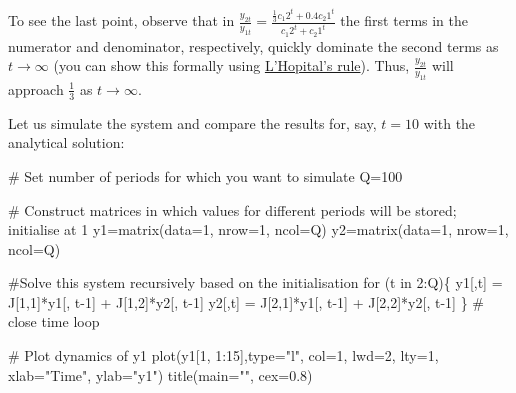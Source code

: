 \documentclass[
  letterpaper,
  DIV=11,
  numbers=noendperiod]{scrreprt}
\newenvironment{Shaded}{\begin{snugshade}}{\end{snugshade}}
\newcommand{\AttributeTok}[1]{\textcolor[rgb]{0.40,0.45,0.13}{#1}}
\newcommand{\CommentTok}[1]{\textcolor[rgb]{0.37,0.37,0.37}{#1}}
\newcommand{\ControlFlowTok}[1]{\textcolor[rgb]{0.00,0.23,0.31}{#1}}
\newcommand{\DecValTok}[1]{\textcolor[rgb]{0.68,0.00,0.00}{#1}}
\newcommand{\FloatTok}[1]{\textcolor[rgb]{0.68,0.00,0.00}{#1}}
\newcommand{\FunctionTok}[1]{\textcolor[rgb]{0.28,0.35,0.67}{#1}}
\newcommand{\NormalTok}[1]{\textcolor[rgb]{0.00,0.23,0.31}{#1}}
\newcommand{\OtherTok}[1]{\textcolor[rgb]{0.00,0.23,0.31}{#1}}
\newcommand{\SpecialCharTok}[1]{\textcolor[rgb]{0.37,0.37,0.37}{#1}}
\newcommand{\StringTok}[1]{\textcolor[rgb]{0.13,0.47,0.30}{#1}}
\begin{document}
To see the last point, observe that in
\(\frac{y_{2t}}{y_{1t}}=\frac{\frac{1}{3}c_{1}2^t + 0.4c_{2}1^t}{c_{1}2^t + c_{2}1^t}\)
the first terms in the numerator and denominator, respectively, quickly
dominate the second terms as \(t \rightarrow \infty\) (you can show this
formally using
\href{https://en.wikipedia.org/wiki/L\%27H\%C3\%B4pital\%27s_rule}{L'Hopital's
rule}). Thus, \(\frac{y_{2t}}{y_{1t}}\) will approach \(\frac{1}{3}\) as
\(t \rightarrow \infty\).

Let us simulate the system and compare the results for, say, \(t=10\)
with the analytical solution:

\begin{Shaded}
\begin{Highlighting}[]
\CommentTok{\# Set number of periods for which you want to simulate}
\NormalTok{Q}\OtherTok{=}\DecValTok{100}

\CommentTok{\# Construct matrices in which values for different periods will be stored; initialise at 1}
\NormalTok{y1}\OtherTok{=}\FunctionTok{matrix}\NormalTok{(}\AttributeTok{data=}\DecValTok{1}\NormalTok{, }\AttributeTok{nrow=}\DecValTok{1}\NormalTok{, }\AttributeTok{ncol=}\NormalTok{Q)}
\NormalTok{y2}\OtherTok{=}\FunctionTok{matrix}\NormalTok{(}\AttributeTok{data=}\DecValTok{1}\NormalTok{, }\AttributeTok{nrow=}\DecValTok{1}\NormalTok{, }\AttributeTok{ncol=}\NormalTok{Q)}

\CommentTok{\#Solve this system recursively based on the initialisation}
  \ControlFlowTok{for}\NormalTok{ (t }\ControlFlowTok{in} \DecValTok{2}\SpecialCharTok{:}\NormalTok{Q)\{}
\NormalTok{    y1[,t] }\OtherTok{=}\NormalTok{ J[}\DecValTok{1}\NormalTok{,}\DecValTok{1}\NormalTok{]}\SpecialCharTok{*}\NormalTok{y1[, t}\DecValTok{{-}1}\NormalTok{] }\SpecialCharTok{+}\NormalTok{ J[}\DecValTok{1}\NormalTok{,}\DecValTok{2}\NormalTok{]}\SpecialCharTok{*}\NormalTok{y2[, t}\DecValTok{{-}1}\NormalTok{]}
\NormalTok{    y2[,t] }\OtherTok{=}\NormalTok{ J[}\DecValTok{2}\NormalTok{,}\DecValTok{1}\NormalTok{]}\SpecialCharTok{*}\NormalTok{y1[, t}\DecValTok{{-}1}\NormalTok{] }\SpecialCharTok{+}\NormalTok{ J[}\DecValTok{2}\NormalTok{,}\DecValTok{2}\NormalTok{]}\SpecialCharTok{*}\NormalTok{y2[, t}\DecValTok{{-}1}\NormalTok{]}
\NormalTok{\} }\CommentTok{\# close time loop}

\CommentTok{\# Plot dynamics of y1}
\FunctionTok{plot}\NormalTok{(y1[}\DecValTok{1}\NormalTok{, }\DecValTok{1}\SpecialCharTok{:}\DecValTok{15}\NormalTok{],}\AttributeTok{type=}\StringTok{"l"}\NormalTok{, }\AttributeTok{col=}\DecValTok{1}\NormalTok{, }\AttributeTok{lwd=}\DecValTok{2}\NormalTok{, }\AttributeTok{lty=}\DecValTok{1}\NormalTok{, }\AttributeTok{xlab=}\StringTok{"Time"}\NormalTok{, }\AttributeTok{ylab=}\StringTok{"y1"}\NormalTok{) }
\FunctionTok{title}\NormalTok{(}\AttributeTok{main=}\StringTok{""}\NormalTok{, }\AttributeTok{cex=}\FloatTok{0.8}\NormalTok{)}
\end{Highlighting}
\end{Shaded}
\end{document}
